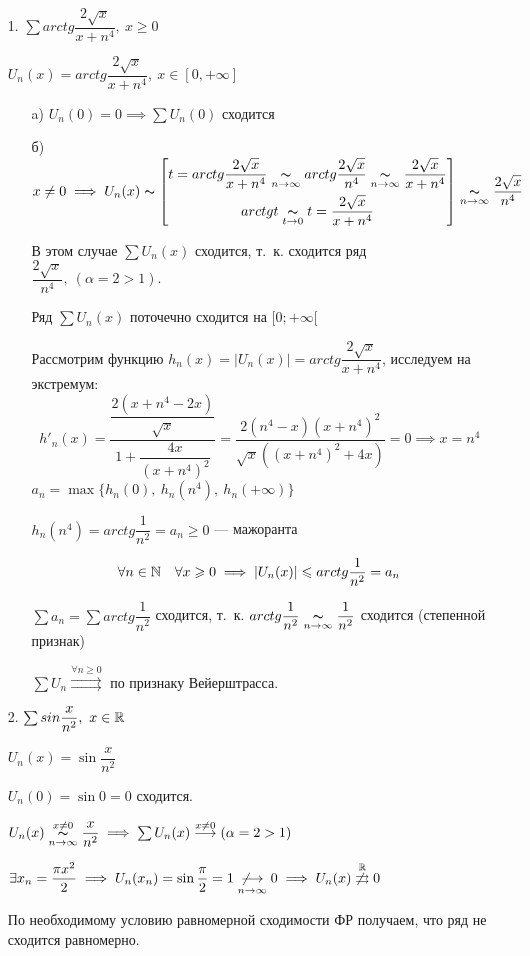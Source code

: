 \documentclass[../../main.tex]{subfiles}
\begin{document}
\begin{exmps}
	\;
	\begin{itemize}
		\item[1.] $\sum arctg\dfrac{2\sqrt{x}}{x+n^4},\ x \geq 0$

$U_n(x) = arctg\dfrac{2\sqrt{x}}{x+n^4},\ x \in [0,+\infty]$
	\begin{itemize}
		\item[a)] $U_n(0) = 0 \implies \sum U_n(0)$ сходится
		\item[б)] $x \neq 0 \implies U_n(x) \thicksim 
	\left[ \begin{gathered}
	t = arctg\dfrac{2\sqrt{x}}{x+n^4} \underset{n \to \infty}{\thicksim} 
	arctg\dfrac{2\sqrt{x}}{n^4} \underset{n \to \infty}{\thicksim}
	\dfrac{2\sqrt{x}}{x+n^4} \\
	arctgt \underset{t \to 0}{\thicksim}
	t = \dfrac{2\sqrt{x}}{x+n^4}
	\end{gathered} \right] \underset{n \to \infty}{\thicksim}
	\dfrac{2\sqrt{x}}{n^4}$
	
	В этом случае $\sum U_n(x)$ сходится, т.~к. сходится ряд 
	$\dfrac{2\sqrt{x}}{n^4},\ (\alpha = 2 > 1)$.
	
	Ряд $\sum U_n(x)$ поточечно сходится на $[0;+\infty[$
	
	Рассмотрим функцию $h_n(x) = |U_n(x)| = arctg\dfrac{2\sqrt{x}}{x+n^4}$, 
	исследуем на экстремум: \\
	\[
	h'_n(x) = \dfrac{\dfrac{2(x + n^4 - 2x)}{\sqrt{x}}}
	{1 + \dfrac{4x}{(x+n^4)^2}} = \dfrac{2(n^4-x)(x+n^4)^2}
	{\sqrt{x}((x+n^4)^2+4x)} = 0 \implies x = n^4
	\]
	$a_n = \max\{ h_n(0),\ h_n(n^4),\ h_n(+\infty) \}$
	
	$ h_n(n^4) = arctg\dfrac{1}{n^2} = a_n \geq 0$ --- мажоранта
	
	\[
	\forall n \in \mathbb{N} \quad \forall x \geqslant 0 \implies |U_n(x)| \leqslant 
	arctg\dfrac{1}{n^2} = a_n
	\]
	
	$\sum a_n = \sum arctg\dfrac{1}{n^2}$ сходится, т.~к. 
	$arctg\dfrac{1}{n^2} \underset{n \to \infty}{\thicksim}
	\dfrac{1}{n^2}$ сходится (степенной признак)
	
	$\sum U_n \overset{\forall n \geq 0}{\rightrightarrows}$ 
	по признаку Вейерштрасса.
	\end{itemize}	

	\item[2.] $\sum sin\dfrac{x}{n^2},\ x \in \mathbb{R}$ 	 
	
	$U_n(x) = \sin\dfrac{x}{n^2}$
	
	$U_n(0) = \sin0 = 0$ сходится.
	
	$U_n(x) \overset{x \neq 0}{\underset{n \to \infty}\thicksim} 
	\dfrac{x}{n^2} \implies \sum U_n(x) \overset{x \neq 0}{\longrightarrow}
	(\alpha = 2 > 1)$	
	
	$\exists x_n = \dfrac{\pi x^2}{2} \implies U_n(x_n) = 
	\sin\dfrac{\pi}{2} = 1 \underset{n \to \infty}
	{\not \longrightarrow} 0 \implies
	U_n(x) \overset{\mathbb{R}}{\not \rightrightarrows} 0$

	По необходимому условию равномерной сходимости ФР получаем, что ряд 
	не сходится равномерно.
	\end{itemize}	
\end{exmps}	
\end{document}
